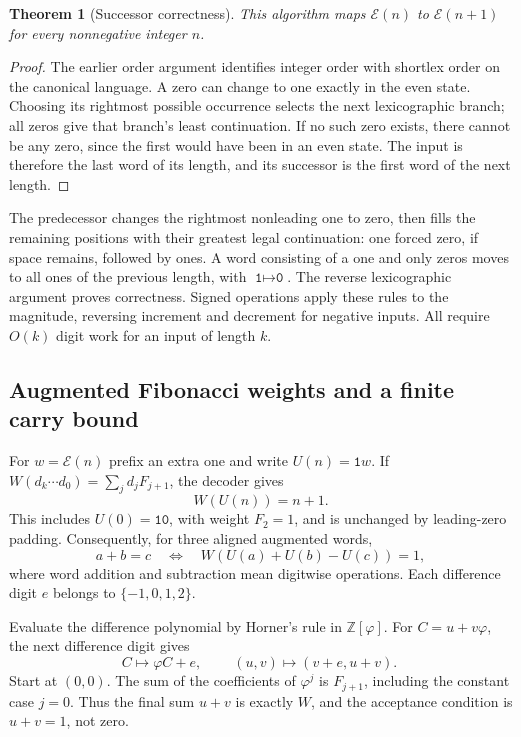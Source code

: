 \documentclass[11pt]{article}
\newtheorem{theorem}{Theorem}[section]
\theoremstyle{definition}\newtheorem{definition}[theorem]{Definition}
\newcommand{\ph}{\varphi}
\newcommand{\E}{\mathcal E}
\begin{document}
\begin{theorem}[Successor correctness]
This algorithm maps $\E(n)$ to $\E(n+1)$ for every nonnegative integer $n$.
\end{theorem}
\begin{proof}
The earlier order argument identifies integer order with shortlex order
on the canonical language. A zero can change to one exactly in the even
state. Choosing its rightmost possible occurrence selects the next
lexicographic branch; all zeros give that branch's least continuation.
If no such zero exists, there cannot be any zero, since the first would
have been in an even state. The input is therefore the last word of its
length, and its successor is the first word of the next length.
\end{proof}
The predecessor changes the rightmost nonleading one to zero, then fills
the remaining positions with their greatest legal continuation: one
forced zero, if space remains, followed by ones. A word consisting of a
one and only zeros moves to all ones of the previous length, with
$\texttt{1}\mapsto\texttt{0}$. The reverse lexicographic argument proves
correctness. Signed operations apply these rules to the magnitude,
reversing increment and decrement for negative inputs. All require
$O(k)$ digit work for an input of length $k$.

\subsection{Augmented Fibonacci weights and a finite carry bound}
For $w=\E(n)$ prefix an extra one and write $U(n)=\texttt{1}w$.
If $W(d_k\cdots d_0)=\sum_j d_jF_{j+1}$, the decoder gives
\[
W(U(n))=n+1.
\]
This includes $U(0)=\texttt{10}$, with weight $F_2=1$, and is unchanged
by leading-zero padding. Consequently, for three aligned augmented words,
\[
a+b=c\quad\Longleftrightarrow\quad
W(U(a)+U(b)-U(c))=1,
\]
where word addition and subtraction mean digitwise operations.
Each difference digit $e$ belongs to $\{-1,0,1,2\}$.

Evaluate the difference polynomial by Horner's rule in $\mathbb Z[\ph]$.
For $C=u+v\ph$, the next difference digit gives
\[
C\longmapsto\ph C+e,\qquad
\boxed{\ (u,v)\longmapsto(v+e,u+v).\ }
\]
Start at $(0,0)$. The sum of the coefficients of $\ph^j$ is $F_{j+1}$,
including the constant case $j=0$. Thus the final sum $u+v$ is exactly
$W$, and the acceptance condition is $u+v=1$, not zero.
\end{document}
